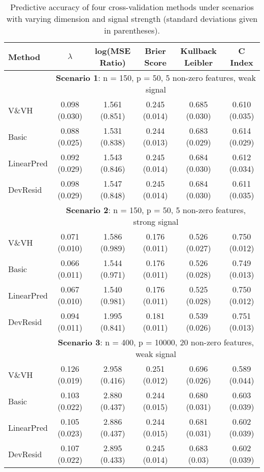 \begin{table}[!htb]

\setlength{\tabcolsep}{3pt}

\caption{\label{Tab:sim} Predictive accuracy of four cross-validation methods under scenarios with varying dimension and signal strength (standard deviations given in parentheses).}
\centering
\begin{tabular}[t]{lccccc}
\toprule
 Method & $\lambda$ & log(MSE Ratio) &Brier Score & Kullback Leibler & C Index\\
\midrule
&\multicolumn{5}{c}{\textbf{Scenario 1}: n = 150, p = 50, 5 non-zero features, weak signal}\\
\cline{2-6}
V\&VH  & 0.098 (0.030) & 1.561 (0.851) & 0.245 (0.014) & 0.685 (0.030) & 0.610 (0.035) \\
Basic  & 0.088 (0.025) & 1.531 (0.838) & 0.244 (0.013) & 0.683 (0.029) & 0.614 (0.029) \\
LinearPred  & 0.092 (0.029) & 1.543 (0.846) & 0.245 (0.014) & 0.684 (0.030) & 0.612 (0.034) \\
DevResid  & 0.098 (0.029) & 1.547 (0.848) & 0.245 (0.014) & 0.684 (0.030) & 0.611 (0.035) \\
\addlinespace
&\multicolumn{5}{c}{\textbf{Scenario 2}: n = 150, p = 50, 5 non-zero features, strong signal}\\
\cline{2-6}
V\&VH  & 0.071 (0.010) & 1.586 (0.989) & 0.176 (0.011) & 0.526 (0.027) & 0.750 (0.012) \\
Basic  & 0.066 (0.011) & 1.544 (0.971) & 0.176 (0.011) & 0.526 (0.028) & 0.749 (0.013) \\
LinearPred  & 0.067 (0.010) & 1.540 (0.981) & 0.176 (0.011) & 0.525 (0.028) & 0.750 (0.012) \\
DevResid  & 0.094 (0.011) & 1.995 (0.841) & 0.181 (0.011) & 0.539 (0.026) & 0.751 (0.013) \\
\addlinespace
&\multicolumn{5}{c}{\textbf{Scenario 3}: n = 400, p = 10000, 20 non-zero features, weak signal}\\
\cline{2-6}
V\&VH  & 0.126 (0.019) & 2.958 (0.416) & 0.251 (0.012) & 0.696 (0.026) & 0.589 (0.044) \\
Basic  & 0.103 (0.022) & 2.880 (0.437) & 0.244 (0.015) & 0.680 (0.031) & 0.603 (0.039) \\
LinearPred  & 0.105 (0.023) & 2.886 (0.437) & 0.244 (0.015) & 0.681 (0.031) & 0.602 (0.039) \\
DevResid  & 0.107 (0.022) & 2.895 (0.433) & 0.245 (0.014) & 0.683 (0.03) & 0.602 (0.039) \\

\end{tabular}
\end{table}
